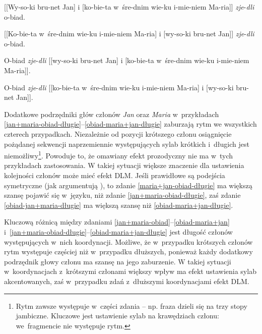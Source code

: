   \begin{exe}
\ex \label{jan+maria-obiad-długie} {
        {[[Wy-so-ki bru-net Jan] i [ko-bie-ta w~śre-dnim wie-ku i-mie-niem Ma-ria]] \textit{zje}-\textit{dli} o-biad.}
        }
        
\ex \label{maria+jan-obiad-długie} {
        {[[Ko-bie-ta w~śre-dnim wie-ku i-mie-niem Ma-ria] i [wy-so-ki bru-net Jan]] \textit{zje}-\textit{dli} o-biad.}
        }
        
\ex \label{obiad-jan+maria-długie} {
        {O-biad \textit{zje}-\textit{dli} [[wy-so-ki bru-net Jan] i [ko-bie-ta w~śre-dnim wie-ku i-mie-niem Ma-ria]].}
        }

\ex \label{obiad-maria+jan-długie} {
        {O-biad \textit{zje}-\textit{dli} [[ko-bie-ta w~śre-dnim wie-ku i-mie-niem Ma-ria] i [wy-so-ki bru-net Jan]].}
        }
\end{exe}      

Dodatkowe podrzędniki głów członów \textit{Jan} oraz \textit{Maria} w~przykładach \eqref{jan+maria-obiad-długie}--\eqref{obiad-maria+jan-długie} zaburzają rytm we wszystkich czterech przypadkach. Niezależnie od pozycji krótszego członu osiągnięcie pożądanej sekwencji naprzemiennie występujących sylab krótkich i~długich jest niemożliwy\footnote{
Rytm zawsze występuje w~części zdania -- np. fraza  dzieli się na trzy stopy jambiczne. Kluczowe jest ustawienie sylab na krawędziach członu: we~fragmencie  nie występuje rytm.}.
Powoduje to, że omawiany efekt prozodyczny nie ma w~tych przykładach zastosowania. W takiej sytuacji większe znaczenie dla ustawienia kolejności członów może mieć efekt DLM. Jeśli prawidłowe są podejścia symetryczne (jak argumentują \citealt{przepiorkowski2023conjunct}), to zdanie \eqref{maria+jan-obiad-długie} ma większą szansę pojawić się w~języku, niż zdanie \eqref{jan+maria-obiad-długie}, zaś zdanie \eqref{obiad-jan+maria-długie} ma większą szansę niż \eqref{obiad-maria+jan-długie}.

Kluczową różnicą między zdaniami \eqref{jan+maria-obiad}--\eqref{obiad-maria+jan} i~\eqref{jan+maria-obiad-długie}--\eqref{obiad-maria+jan-długie} jest długość członów występujących w~nich koordynacji. Możliwe, że w~przypadku krótszych członów rytm występuje częściej niż w~przypadku dłuższych, ponieważ każdy dodatkowy podrzędnik głowy członu ma szansę na jego zaburzenie. W takiej sytuacji w~koordynacjach z~krótszymi członami większy wpływ ma efekt ustawienia sylab akcentowanych, zaś w~przypadku zdań z~dłuższymi koordynacjami efekt DLM.

